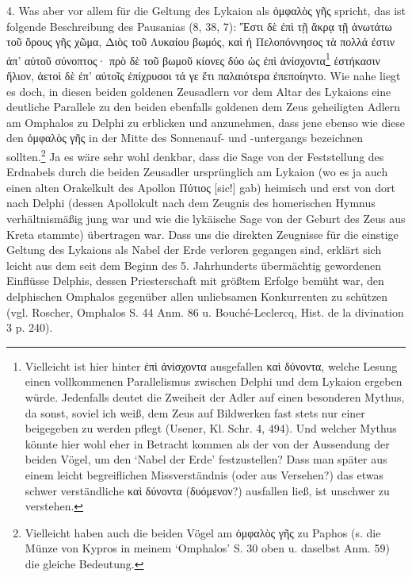 \documentclass[a4paper, 11pt, oneside]{article}
\begin{document}
4. Was aber vor allem für die Geltung des Lykaion als ὀμφαλὸς γῆς spricht, das ist folgende Beschreibung des Pausanias (8, 38, 7): Ἔστι δὲ ἐπὶ τῇ ἄκρᾳ τῇ ἀνωτάτω τοῦ ὄρους γῆς χῶμα, Διὸς τοῦ Λυκαίου βωμός, καὶ ἡ Πελοπόννησος τὰ πολλά ἐστιν ἀπ' αὐτοῦ σύνοπτος· πρὸ δὲ τοῦ βωμοῦ κίονες δύο ὡς ἐπὶ ἀνίσχοντα\footnote{Vielleicht ist hier hinter ἐπὶ ἀνίσχοντα ausgefallen καὶ δύνοντα, welche Lesung einen vollkommenen Parallelismus zwischen Delphi und dem Lykaion ergeben würde. Jedenfalls deutet die Zweiheit der Adler auf einen besonderen Mythus, da sonst, soviel ich weiß, dem Zeus auf Bildwerken fast stets nur einer beigegeben zu werden pflegt (Usener, Kl. Schr. 4, 494). Und welcher Mythus könnte hier wohl eher in Betracht kommen als der von der Aussendung der beiden Vögel, um den `Nabel der Erde' festzustellen? Dass man später aus einem leicht begreiflichen Missverständnis (oder aus Versehen?) das etwas schwer verständliche καὶ δύνοντα (δυόμενον?) ausfallen ließ, ist unschwer zu verstehen.} ἑστήκασιν ἥλιον, ἀετοὶ δὲ ἐπ' αὐτοῖς ἐπίχρυσοι τά γε ἔτι παλαιότερα ἐπεποίηντο. Wie nahe liegt es doch, in diesen beiden goldenen Zeusadlern vor dem Altar des Lykaions eine deutliche Parallele zu den beiden ebenfalls goldenen dem Zeus geheiligten Adlern am Omphalos zu Delphi zu erblicken und anzunehmen, dass jene ebenso wie diese den ὀμφαλὸς γῆς in der Mitte des Sonnenauf- und -untergangs bezeichnen sollten.\footnote{Vielleicht haben auch die beiden Vögel am ὀμφαλὸς γῆς zu Paphos (s. die Münze von Kypros in meinem `Omphalos' S. 30 oben u. daselbst Anm. 59) die gleiche Bedeutung.} Ja es wäre sehr wohl denkbar, dass die Sage von der Feststellung des Erdnabels durch die beiden Zeusadler ursprünglich am Lykaion (wo es ja auch einen alten Orakelkult des Apollon Πύτιος [sic!] gab) heimisch und erst von dort nach Delphi (dessen Apollokult nach dem Zeugnis des homerischen Hymnus verhältnismäßig jung war und wie die lykäische Sage von der Geburt des Zeus aus Kreta stammte) übertragen war. Dass uns die direkten Zeugnisse für die einstige Geltung des Lykaions als Nabel der Erde verloren gegangen sind, erklärt sich leicht aus dem seit dem Beginn des 5. Jahrhunderts übermächtig gewordenen Einflüsse Delphis, dessen Priesterschaft mit größtem Erfolge bemüht war, den delphischen Omphalos gegenüber allen unliebsamen Konkurrenten zu schützen (vgl. Roscher, Omphalos S. 44 Anm. 86 u. Bouché-Leclercq, Hist. de la divination 3 p. 240).
\end{document}
